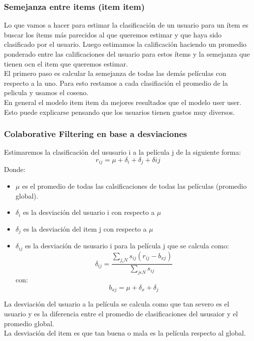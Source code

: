 \documentclass[titlepage,a4paper]{article}
\begin{document}
\subsubsection*{Semejanza entre items (item item)}
Lo que vamos a hacer para estimar la clasificación de un usuario para un ítem es buscar los ítems más parecidos al que queremos estimar y que haya sido clasificado por el usuario. Luego estimamos la calificación haciendo un promedio ponderado entre las calificaciones del usuario para estos ítems y la semejanza que tienen ocn el item que queremos estimar. \\

El primero paso es calcular la semejanza de todas las demás películas con respecto a la uno. Para esto restamos a cada clasifiación el promedio de la pelicula y usamos el coseno. \\

En general el modelo item item da mejores resultados que el modelo user user. Esto puede explicarse pensando que los usuarios tienen gustos muy diversos. 

\subsubsection*{Colaborative Filtering en base a desviaciones}
Estimaremos la clasificación del ususario i a la película j de la siguiente forma: $$r_{ij} = \mu + \delta_i + \delta_j + \delta{ij} $$
Donde:
\begin{itemize}
\item $\mu$ es el promedio de todas las calsificaciones de todas las películas (promedio global). 
\item $\delta_i$ es la desviación del usuario i con respecto a $\mu$
\item $\delta_j$ es la desviación del item j con respecto a $\mu$
\item $\delta_{ij}$ es la desviación de ususario i para la película j que se calcula como:$$\delta_{ij} = \frac{\sum_{j_\epsilon N}s_{ij}(r_{ij}-b_{xj})}{\sum_{j\epsilon N}s_{ij}}$$
con: $$b_{xj} = \mu +\delta_x + \delta_j$$
\end{itemize} 
La desviación del usuario a la película se calcula como que tan severo es el usuario y es la diferencia entre el promedio de clasificaciones del ususaior y el promedio global. \\

La desviación del item es que tan buena o mala es la película respecto al global. \\
\end{document}

